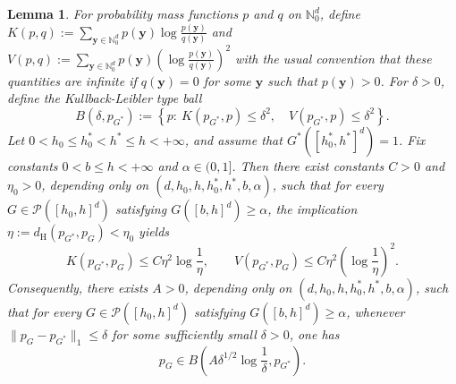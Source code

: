 \documentclass[twoside,12pt]{article}
\newtheorem{lem}[thm]{Lemma}
\begin{document}
\begin{lem}\label{lem:Poisson_WS_d}
For probability mass functions $p$ and $q$ on $\mathbb N_0^d$, define $K(p,q):=\sum_{\boldsymbol y\in\mathbb N_0^d} p(\boldsymbol y) \log\frac{p(\boldsymbol y)}{q(\boldsymbol y)}$ and $V(p,q):=\sum_{\boldsymbol y\in\mathbb N_0^d} p(\boldsymbol y) \left(\log\frac{p(\boldsymbol y)}{q(\boldsymbol y)}\right)^2$ with the usual convention that these quantities are infinite if $q(\boldsymbol y)=0$ for some $\boldsymbol y$ such that $p(\boldsymbol y)>0$. For $\delta>0$, define the Kullback-Leibler type ball
\begin{displaymath}
B(\delta,p_{G^\ast}) := \left\{ p:\ K(p_{G^\ast},p)\le\delta^2,\quad V(p_{G^\ast},p)\le\delta^2 \right\}. 
\end{displaymath}
Let $0<h_0\le h_0^\ast<h^\ast\le h<+\infty$, and assume that $G^\ast([h_0^\ast,h^\ast]^d)=1$. Fix constants $0<b\le h<+\infty$ and $\alpha\in(0,1]$. Then there exist constants $C>0$ and $\eta_0>0$, depending only on $(d,h_0,h,h_0^\ast,h^\ast,b,\alpha)$, such that for every $G\in\mathcal P([h_0,h]^d)$ satisfying $G([b,h]^d)\ge\alpha$, the implication $\eta:=d_{\mathrm H}(p_{G^\ast},p_G)<\eta_0$ yields 
\begin{displaymath}
K(p_{G^\ast},p_G)\le C\eta^2\log\frac{1}{\eta}, \qquad V(p_{G^\ast},p_G)\le C\eta^2\left(\log\frac{1}{\eta}\right)^2. 
\end{displaymath}
Consequently, there exists $A>0$, depending only on $(d,h_0,h,h_0^\ast,h^\ast,b,\alpha)$, such that for every $G\in\mathcal P([h_0,h]^d)$ satisfying $G([b,h]^d)\ge\alpha$, whenever $\|p_G-p_{G^\ast}\|_1\le\delta$ for some sufficiently small $\delta>0$, one has 
\begin{displaymath}
p_G\in B\!\left( A\delta^{1/2}\log\frac{1}{\delta}, p_{G^\ast} \right).
\end{displaymath}
\end{lem}
\end{document}
